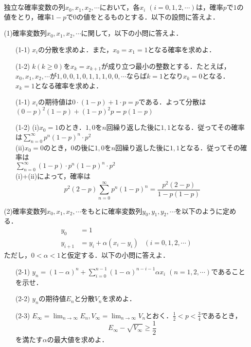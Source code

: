 \documentclass[a4j]{jarticle}
\let \ds \displaystyle
\begin{document}
\section{}

\begin{screen}
 独立な確率変数の列$x_0,x_1,x_2,\cdots$において，各$x_i$ $(i=0,1,2,\cdots)$は，確率$p$で$1$の値をとり，確率$1-p$で$0$の値をとるものとする．以下の設問に答えよ．
\end{screen}


\begin{screen}
 (1)確率変数列$x_0,x_1,x_2,\cdots$に関して，以下の小問に答えよ．
 \begin{itemize}
  \item[(1-1)]$x_i$の分散を求めよ．また，$x_0=x_1=1$となる確率を求めよ．
  \item[(1-2)]$k(k\geq 0)$を$x_k=x_{k+1}$が成り立つ最小の整数とする．たとえば，$x_0,x_1,x_2,\cdots$が$1,0,0,1,0,1,1,1,0,0,\cdots$ならば$k=1$となり$x_k=0$となる．\\
              $x_k=1$となる確率を求めよ．
 \end{itemize}
\end{screen}

\begin{itemize}
 \item[(1-1)] $x_i$の期待値は$0\cdot (1-p) + 1\cdot p = p$である．よって分散は$(0-p)^2 (1-p) + (1-p)^2 p = p(1-p)$
 \item[(1-2)] (i)$x_0=1$のとき．$1,0$を$n$回繰り返した後に$1,1$となる．従ってその確率は$\ds \sum_{n=0}^\infty p^n(1-p)^n\cdot p^2$ \\
              (ii)$x_0=0$のとき，$0$の後に$1,0$を$n$回繰り返した後に$1,1$となる．従ってその確率は \\ $\ds \sum_{n=0}^\infty (1-p) \cdot p^n(1-p)^n\cdot p^2$  \\
              (i)+(ii)によって，確率は
              $$p^2(2-p)\sum_{n=0}^\infty p^n(1-p)^n = \frac{p^2(2-p)}{1-p(1-p)}$$
\end{itemize}

\begin{screen}
 (2)確率変数列$x_0,x_1,x_2,\cdots$をもとに確率変数列$y_0,y_1,y_2,\cdots$を以下のように定める．
 \begin{align*}
  y_0 &= 1 & \\
  y_{i+1} &= y_i + \alpha(x_i-y_i) & (i=0,1,2,\cdots)
 \end{align*}
 ただし，$0<\alpha<1$と仮定する．以下の小問に答えよ．
 \begin{itemize}
  \item[(2-1)] $\ds y_n=(1-\alpha)^n + \sum_{i=0}^{n-1}(1-\alpha)^{n-i-1}\alpha x_i$ $(n=1,2,\cdots)$であることを示せ．
  \item[(2-2)] $y_n$の期待値$E_n$と分散$V_n$を求めよ．
  \item[(2-3)] $\ds E_\infty = \lim_{n\rightarrow \infty}E_n,V_\infty = \lim_{n\rightarrow \infty}V_n$とおく．$\ds \frac{1}{2}<p<\frac{3}{4}$であるとき，
               $$E_\infty - \sqrt{V_\infty} \geq \frac{1}{2}$$
               を満たす$\alpha$の最大値を求めよ．
 \end{itemize}
\end{screen}
\end{document}
